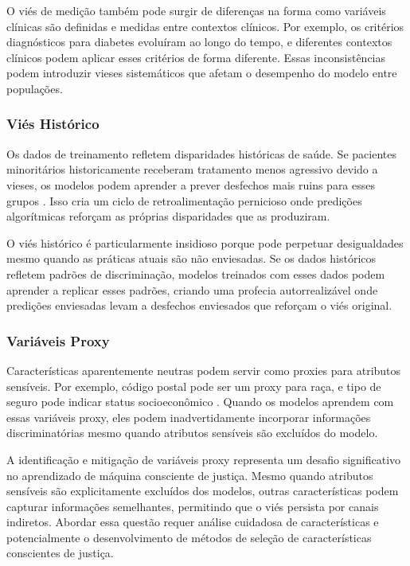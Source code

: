 O viés de medição também pode surgir de diferenças na forma como variáveis 
clínicas são definidas e medidas entre contextos clínicos. Por exemplo, 
os critérios diagnósticos para diabetes evoluíram ao longo do tempo, e 
diferentes contextos clínicos podem aplicar esses critérios de forma 
diferente. Essas inconsistências podem introduzir vieses sistemáticos 
que afetam o desempenho do modelo entre populações.

\subsubsection{Viés Histórico}

Os dados de treinamento refletem disparidades históricas de saúde. Se 
pacientes minoritários historicamente receberam tratamento menos agressivo 
devido a vieses, os modelos podem aprender a prever desfechos mais ruins 
para esses grupos \cite{fries2019}. Isso cria um ciclo de retroalimentação 
pernicioso onde predições algorítmicas reforçam as próprias disparidades 
que as produziram.

O viés histórico é particularmente insidioso porque pode perpetuar 
desigualdades mesmo quando as práticas atuais são não enviesadas. Se os 
dados históricos refletem padrões de discriminação, modelos treinados 
com esses dados podem aprender a replicar esses padrões, criando uma 
profecia autorrealizável onde predições enviesadas levam a desfechos 
enviesados que reforçam o viés original.

\subsubsection{Variáveis Proxy}

Características aparentemente neutras podem servir como proxies para 
atributos sensíveis. Por exemplo, código postal pode ser um proxy para 
raça, e tipo de seguro pode indicar status socioeconômico \cite{lum2016}. 
Quando os modelos aprendem com essas variáveis proxy, eles podem 
inadvertidamente incorporar informações discriminatórias mesmo quando 
atributos sensíveis são excluídos do modelo.

A identificação e mitigação de variáveis proxy representa um desafio 
significativo no aprendizado de máquina consciente de justiça. Mesmo 
quando atributos sensíveis são explicitamente excluídos dos modelos, 
outras características podem capturar informações semelhantes, permitindo 
que o viés persista por canais indiretos. Abordar essa questão requer 
análise cuidadosa de características e potencialmente o desenvolvimento 
de métodos de seleção de características conscientes de justiça.

